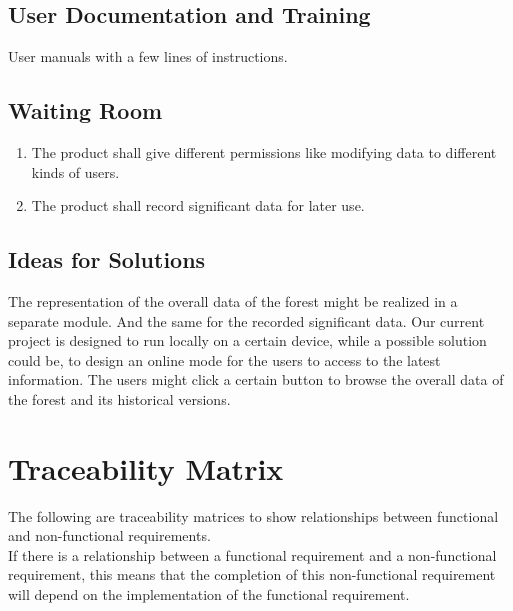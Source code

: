 \documentclass{article}
\begin{document}
\subsection{User Documentation and Training}
User manuals with a few lines of instructions. 
\subsection{Waiting Room}
\begin{enumerate}
    \item The product shall give different permissions like modifying data to different kinds of users.
    \item The product shall record significant data for later use.
\end{enumerate}
\subsection{Ideas for Solutions}
The representation of the overall data of the forest might be realized in a separate module. And the same for the recorded significant data. Our current project is designed to run locally on a certain device, while a possible solution could be, to design an online mode for the users to access to the latest information. The users might click a certain button to browse the overall data of the forest and its historical versions. 

\newpage

\section{Traceability Matrix}
\newcommand{\CM}{\checkmark}
The following are traceability matrices to show relationships between
functional and non-functional requirements.\\
If there is a relationship between a functional requirement and a non-functional requirement, 
this means that the completion of this non-functional requirement will depend on the implementation of the functional requirement.
\end{document}
